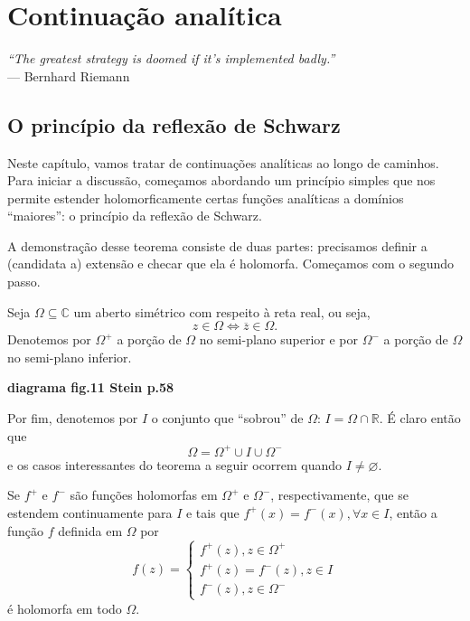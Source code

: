 \chapter[Continuação analítica]{Continuação analítica}
\chaptermark{}

\hfill%
\begin{minipage}{10cm}
\begin{flushright}
\rightskip=0.5cm
\textit{``The greatest strategy is doomed if it's implemented badly.''}
\\[0.1cm]
\rightskip=0.5cm
--- Bernhard Riemann
\end{flushright}
\end{minipage}

\section{O princípio da reflexão de Schwarz}

Neste capítulo, vamos tratar de continuações analíticas ao longo de caminhos.
Para iniciar a discussão, começamos abordando um princípio simples que nos permite
estender holomorficamente certas funções analíticas a domínios ``maiores'': 
o princípio da reflexão de Schwarz.

A demonstração desse teorema consiste de duas partes: precisamos definir a 
(candidata a) extensão e checar que ela é holomorfa. Começamos com o segundo passo.

Seja $\Omega\subseteq\mathbb{C}$ um aberto simétrico com respeito à reta real, ou seja,
\begin{equation*}
    z\in\Omega \iff \overline{z}\in\Omega.
\end{equation*}
Denotemos por $\Omega^+$ a porção de $\Omega$ no semi-plano superior e por $\Omega^-$
a porção de $\Omega$ no semi-plano inferior.

\begin{center}
    \textbf{diagrama fig.11 Stein p.58}
\end{center}

Por fim, denotemos por $I$ o conjunto que ``sobrou'' de $\Omega$: 
$I = \Omega\cap\mathbb{R}$. É claro então que
\begin{equation*}
    \Omega = \Omega^+ \cup I \cup \Omega^-
\end{equation*}
e os casos interessantes do teorema a seguir ocorrem quando $I\neq\varnothing$.

\begin{teorema}
\label{teo-principio-simetria}
Se $f^+$ e $f^-$ são funções holomorfas em $\Omega^+$ e $\Omega^-$, respectivamente,
que se estendem continuamente para $I$ e tais que $f^+(x) = f^-(x), \forall x\in I$,
então a função $f$ definida em $\Omega$ por
\begin{equation*}
    f(z) = \begin{cases}
    f^+(z), z\in\Omega^+ \\
    f^+(z) = f^-(z), z\in I \\
    f^-(z), z\in\Omega^-
    \end{cases}
\end{equation*}
é holomorfa em todo $\Omega$.
\end{teorema}


